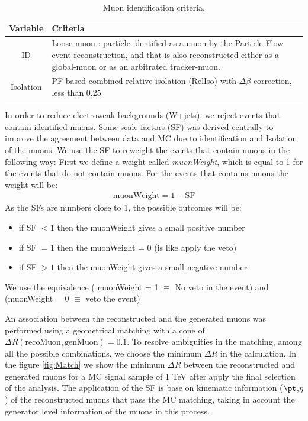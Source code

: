 \begin{table}[h!]
 \centering
  \caption{Muon identification criteria.}
  \label{tab:MuonID}
  \begin{tabular}{|c|p{15cm}| }
\hline
Variable                 &          Criteria          \\
\hline
ID                    &          Loose muon : particle identified as a muon by the Particle-Flow event reconstruction, and that is also reconstructed either as a global-muon or as an arbitrated tracker-muon.    \\ \hline
Isolation             &          PF-based combined relative isolation (RelIso) with $\Delta \beta$ correction, less than 0.25                   \\
\hline
\end{tabular}
\end{table}

In order to reduce electroweak backgrounds (W+jets), we reject events that contain identified muons. Some scale factors (SF) was derived centrally to improve the agreement between data and MC due to identification and Isolation of the muons. We use the SF to reweight the events that contain muons in the following way:
First we define a weight called \emph{muonWeight},  which is equal to 1 for the events that do not contain muons. For the events that contains muons the weight will be:
\begin{eqnarray}
\text{muonWeight} = 1-\text{SF}
\end{eqnarray}
As the SFs are numbers close to 1, the possible outcomes will be:
\begin{itemize}
\item
if SF $<1$ then the muonWeight gives a small positive number
\item
if SF  $=1$ then the muonWeight = 0 (is like apply the veto)
\item
if SF $>1$ then the  muonWeight gives a small negative number
\end{itemize}
We use the equivalence ( muonWeight = 1 $\equiv$ No veto in the event) and (muonWeight = 0 $\equiv$ veto the event)

An association between the reconstructed and the generated muons was performed using a geometrical matching with a cone of $\Delta R(\text{recoMuon},\text{genMuon}) = 0.1$. To resolve ambiguities in the matching, among all the possible combinations, we choose the minimum $\Delta R$ in the calculation. In the figure \ref{fig:Match} we show the minimum $\Delta R$ between the reconstructed and generated muons for a MC signal sample of 1 TeV after apply the final selection of the analysis. The application of the SF is base on kinematic information ($\pt$,$\eta$) of the reconstructed muons that pass the MC matching, taking in account the generator level information of the muons in this process.

